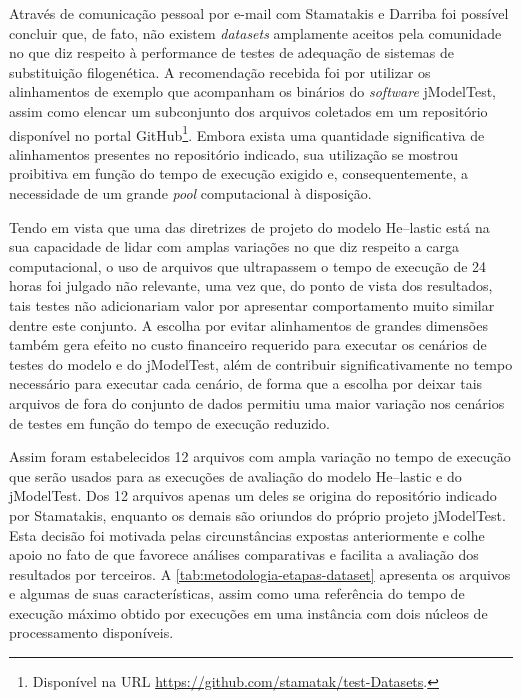 \documentclass[english,brazilian]{UNISINOSmonografia} %
\begin{document}
Através de comunicação pessoal por e-mail com Stamatakis e Darriba foi possível concluir que, de fato, não existem \textit{datasets} amplamente aceitos pela comunidade no que diz respeito à performance de testes de adequação de sistemas de substituição filogenética.
A recomendação recebida foi por utilizar os alinhamentos de exemplo que acompanham os binários do \textit{software} jModelTest, assim como elencar um subconjunto dos arquivos coletados em um repositório disponível no portal GitHub\footnote{
	Disponível na URL \url{https://github.com/stamatak/test-Datasets}.
}.
Embora exista uma quantidade significativa de alinhamentos presentes no repositório indicado, sua utilização se mostrou proibitiva em função do tempo de execução exigido e, consequentemente, a necessidade de um grande \textit{pool} computacional à disposição.


Tendo em vista que uma das diretrizes de projeto do modelo \textsf{He}--lastic está na sua capacidade de lidar com amplas variações no que diz respeito a carga computacional, o uso de arquivos que ultrapassem o tempo de execução de 24 horas foi julgado não relevante, uma vez que, do ponto de vista dos resultados, tais testes não adicionariam valor por apresentar comportamento muito similar dentre este conjunto.
A escolha por evitar alinhamentos de grandes dimensões também gera efeito no custo financeiro requerido para executar os cenários de testes do modelo e do jModelTest, além de contribuir significativamente no tempo necessário para executar cada cenário, de forma que a escolha por deixar tais arquivos de fora do conjunto de dados permitiu uma maior variação nos cenários de testes em função do tempo de execução reduzido.


Assim foram estabelecidos 12 arquivos com ampla variação no tempo de execução que serão usados para as execuções de avaliação do modelo \textsf{He}--lastic e do jModelTest.
Dos 12 arquivos apenas um deles se origina do repositório indicado por Stamatakis, enquanto os demais são oriundos do próprio projeto jModelTest.
Esta decisão foi motivada pelas circunstâncias expostas anteriormente e colhe apoio no fato de que favorece análises comparativas e facilita a avaliação dos resultados por terceiros.
A \autoref{tab:metodologia-etapas-dataset} apresenta os arquivos e algumas de suas características, assim como uma referência do tempo de execução máximo obtido por execuções em uma instância com dois núcleos de processamento disponíveis.
\end{document}
